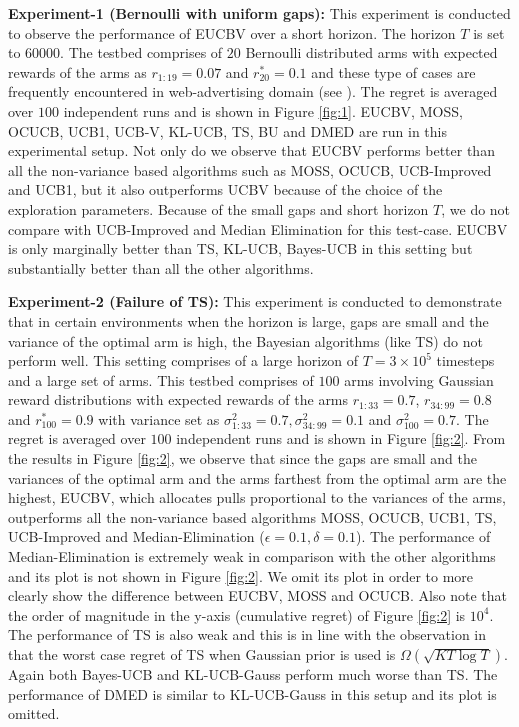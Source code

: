 \textbf{Experiment-1 (Bernoulli with uniform gaps):} This experiment is conducted to observe the performance of EUCBV over a short horizon. The horizon $T$ is set to $60000$. The testbed comprises of $20$ Bernoulli distributed arms with expected rewards of the arms as $r_{1:19}=0.07$ and $r^{*}_{20}=0.1$ and these type of cases are frequently encountered in web-advertising domain (see \cite{garivier2011kl}). The regret is averaged over $100$ independent runs and is shown in Figure \ref{fig:1}. EUCBV, MOSS, OCUCB, UCB1, UCB-V, KL-UCB, TS, BU and DMED are run in this experimental setup. Not only do we observe that EUCBV performs better than all the non-variance based algorithms such as MOSS, OCUCB, UCB-Improved and UCB1, but it also outperforms UCBV because of the choice of the exploration parameters. Because of the small gaps and short horizon $T$, we do not compare with UCB-Improved and Median Elimination for this test-case. EUCBV is only marginally better than TS, KL-UCB, Bayes-UCB in this setting but substantially better than all the other algorithms.

\textbf{Experiment-2 (Failure of TS):} This experiment is conducted to demonstrate that in certain environments when the horizon is large, gaps are small and the variance of the optimal arm is high, the Bayesian algorithms (like TS) do not perform well. This setting comprises of a large horizon of $T = 3\times 10^{5}$ timesteps and a large set of arms. This testbed comprises of $100$ arms involving Gaussian reward distributions with expected rewards of the arms $r_{1:33}=0.7$, $r_{34:99}=0.8$ and $r^{*}_{100}=0.9$ with variance set as $\sigma_{1:33}^{2} = 0.7,\sigma_{34:99}^{2} = 0.1$ and $\sigma^{2}_{100}=0.7$. The regret is averaged over $100$ independent runs and is shown in Figure \ref{fig:2}. From the results in Figure \ref{fig:2}, we observe that since the gaps are small and the variances of the optimal arm and the arms farthest from the optimal arm are the highest, EUCBV, which allocates pulls proportional to the variances of the arms,  outperforms all the non-variance based algorithms MOSS, OCUCB, UCB1, TS, UCB-Improved and Median-Elimination ($\epsilon=0.1,\delta=0.1$). The performance of Median-Elimination is extremely weak in comparison with the other algorithms and its plot is not shown in Figure \ref{fig:2}. We omit its plot in order to more clearly show the difference between EUCBV, MOSS and OCUCB. Also note that the order of magnitude in the y-axis (cumulative regret) of Figure \ref{fig:2} is $10^4$. The performance of TS is also weak and this is in line with the observation in  \cite{lattimore2015optimally} that the worst case regret of TS when Gaussian prior is used is $\Omega\left( \sqrt{KT\log T}\right)$. Again both Bayes-UCB and KL-UCB-Gauss perform much worse than TS. The performance of DMED is similar to KL-UCB-Gauss in this setup and its plot is omitted. 

